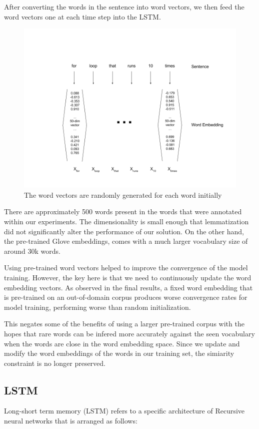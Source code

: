\documentclass[fyp]{socreport}
\begin{document}
After converting the words in the sentence into word vectors, we then feed the
word vectors one at each time step into the LSTM.

\begin{figure}[h]
\includegraphics[width=\textwidth]{embedding.png}
\caption{The word vectors are randomly generated for each word initially}
\centering
\end{figure}

There are approximately 500 words present in the words that were annotated within
our experiments. The dimensionality is small enough that lemmatization did
not significantly alter the performance of our solution. On the other hand, the
pre-trained Glove embeddings, comes with a much larger vocabulary size of
around 30k words.

Using pre-trained word vectors helped to improve the convergence of the model
training. However, the key here is that we need to continuously update the
word embedding vectors. As observed in the final results, a fixed word embedding
that is pre-trained on an out-of-domain corpus produces worse convergence rates
for model training, performing worse than random initialization.

This negates some of the benefits of using a larger pre-trained corpus with the
hopes that rare words can be infered more accurately against the seen vocabulary
when the words are close in the word embedding space. Since we update and
modify the word embeddings of the words in our training set, the simiarity
constraint is no longer preserved.


\subsection{LSTM}
Long-short term memory (LSTM) refers to a specific architecture of Recursive
neural networks that is arranged as follows:
\end{document}
